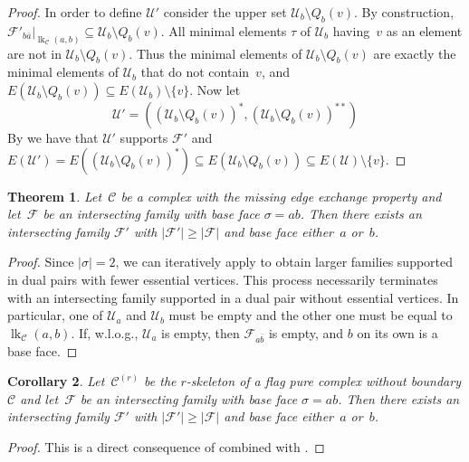 \documentclass[a4paper,12pt]{amsart}
\theoremstyle{plain}
\newtheorem{theorem}{Theorem}[section]
\newtheorem{corollary}[theorem]{Corollary}
\theoremstyle{definition}
\newcommand{\U}{\mathcal U}
\newcommand{\C}{\mathcal C}
\newcommand{\family}{\mathcal F}
\newcommand{\face}{\sigma}
\newcommand{\smallface}{\tau}
\DeclareMathOperator{\link}{lk}
\newcommand{\lkcap}[3]{\operatorname{lk}_{#1} (#2,#3)}
\begin{document}
\begin{proof}
\medskip

In order to define $\U'$ consider the upper set $\U_b \setminus Q_b(v)$. By construction, $\family'_{b\bar a} |_{\lkcap{\C}{a}{b}} \subseteq \U_b \setminus Q_b(v)$. All minimal elements $\smallface$ of $\U_b$ having~$v$ as an element are not in $\U_b \setminus Q_b(v)$. Thus the minimal elements of $\U_b \setminus Q_b(v)$ are exactly the minimal elements of $\U_b$ that do not contain~$v$, and $E(\U_b \setminus Q_b(v)) \subseteq E(\U_b) \setminus \{v\}$. Now let
\[
\U' = \left( (\U_b \setminus Q_b(v))^*, (\U_b \setminus Q_b(v))^{**}  \right)
\]
By  we have that $\U'$ supports $\family'$ and $E(\U') = E((\U_b \setminus Q_b(v))^*) \subseteq E(\U_b \setminus Q_b(v)) \subseteq E(\U) \setminus \{v\}$.
\end{proof}

\begin{theorem}
\label{theorem_2_to_1_meep}
  Let~$\C$ be a complex with the missing edge exchange property and let~$\family$ be an intersecting family with base face $\face = ab$. Then there exists an intersecting family $\family'$ with $|\family'|\geq |\family|$ and base face either~$a$ or~$b$.
\end{theorem}

\begin{proof}
  Since $|\face|=2$, we can iteratively apply  to obtain larger families supported in dual pairs with fewer essential vertices. This process necessarily terminates with an intersecting family supported in a dual pair without essential vertices. In particular, one of $\U_a$ and $\U_b$ must be empty and the other one must be equal to $\link_\C({a,b})$. If, w.l.o.g., $\U_a$ is empty, then $\family_{a\overline b}$ is empty, and $b$ on its own is a base face.
\end{proof}

\begin{corollary}
\label{corollary_2_to_1}
  Let~$\C^{(r)}$ be the $r$-skeleton of a flag pure complex without boundary $\C$ and let~$\family$ be an intersecting family with base face $\face = ab$. Then there exists an intersecting family $\family'$ with $|\family'|\geq |\family|$ and base face either~$a$ or~$b$.
\end{corollary}

\begin{proof}
  This is a direct consequence of  combined with .
\end{proof}
\end{document}
